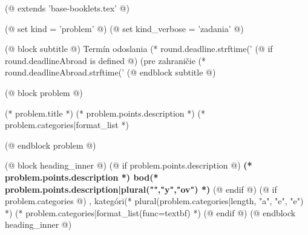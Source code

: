 (@ extends 'base-booklets.tex' @)

(@ set kind = 'problem' @)
(@ set kind_verbose = 'zadania' @)

(@ block subtitle @)
    {
        \centering
        \vspace*{-5mm}
        Termín odoslania (* round.deadline.strftime('%
        (@ if round.deadlineAbroad is defined @) (pre zahraničie (* round.deadlineAbroad.strftime('%
    }
(@ endblock subtitle @)

(@ block problem @)
    \begin{seminar-problem}{(* problem.title *)}%
        {(* problem.points.description *)}%
        {(* problem.categories|format_list *)}
    \end{seminar-problem}
(@ endblock problem @)

(@ block heading_inner @)
    (@ if problem.points.description @)%
        \textbf{(* problem.points.description *) bod(* problem.points.description|plural("","y","ov") *)}%
    (@ endif @)%
    (@ if problem.categories @)%
        , kategóri(* plural(problem.categories|length, "a", "e", "e") *) (* problem.categories|format_list(func=textbf) *)%
    (@ endif @)%
(@ endblock heading_inner @)

